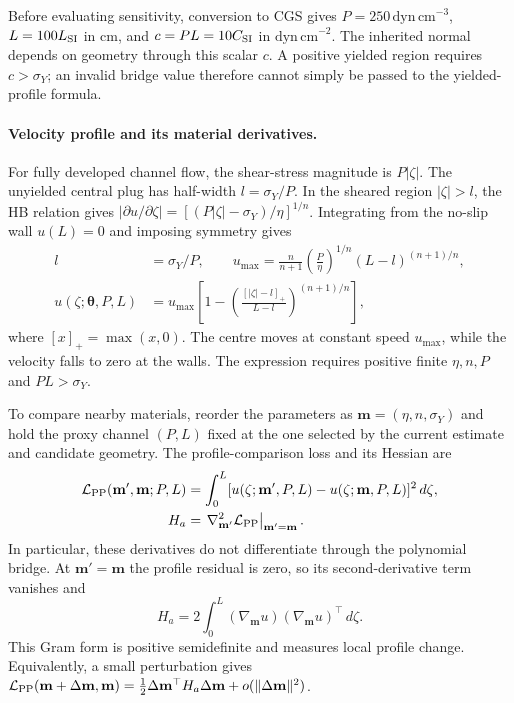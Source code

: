 Before evaluating sensitivity, conversion to CGS gives
$P=250\,\mathrm{dyn\,cm}^{-3}$, $L=100L_{\rm SI}$ in cm, and
$c=PL=10C_{\rm SI}$ in $\mathrm{dyn\,cm}^{-2}$. The inherited
normal depends on geometry through this scalar $c$. A positive yielded
region requires $c>\sigma_Y$; an invalid bridge value therefore cannot
simply be passed to the yielded-profile formula.

\paragraph{Velocity profile and its material derivatives.}
For fully developed channel flow, the shear-stress magnitude is
$P|\zeta|$. The unyielded central plug has half-width
$l=\sigma_Y/P$. In the sheared region $|\zeta|>l$, the HB relation
gives $|\partial u/\partial\zeta|=[(P|\zeta|-\sigma_Y)/\eta]^{1/n}$.
Integrating from the no-slip wall $u(L)=0$ and imposing symmetry gives
\begin{equation}
\label{eq:pp-velocity}
\begin{aligned}
 l&=\sigma_Y/P,\qquad
 u_{\max}=\frac{n}{n+1}\left(\frac P\eta\right)^{1/n}(L-l)^{(n+1)/n},\\
 u(\zeta;\boldsymbol\theta,P,L)
 &=u_{\max}\left[1-\left(\frac{[|\zeta|-l]_+}{L-l}\right)^{(n+1)/n}\right],
\end{aligned}
\end{equation}
where $[x]_+=\max(x,0)$. The centre moves at constant speed
$u_{\max}$, while the velocity falls to zero at the walls. The
expression requires positive finite $\eta,n,P$ and $PL>\sigma_Y$.

To compare nearby materials, reorder the parameters as
$\mathbf m=(\eta,n,\sigma_Y)$ and hold the proxy channel $(P,L)$
fixed at the one selected by the current estimate and candidate geometry.
The profile-comparison loss and its Hessian are
\begin{equation}
\label{eq:pp-hessian}
\begin{aligned}
 \mathcal L_{\rm PP}(\mathbf m',\mathbf m;P,L)
 &=\int_0^L [u(\zeta;\mathbf m',P,L)-u(\zeta;\mathbf m,P,L)]^2\,d\zeta,\\
 H_a&=\left.\nabla_{\mathbf m'}^2\mathcal L_{\rm PP}\right|_{\mathbf m'=\mathbf m}.
\end{aligned}
\end{equation}
In particular, these derivatives do not differentiate through the
polynomial bridge. At $\mathbf m'=\mathbf m$ the profile residual is
zero, so its second-derivative term vanishes and
\begin{equation}
\label{eq:pp-hessian-gram}
 H_a=2\int_0^L
       (\nabla_{\mathbf m}u)(\nabla_{\mathbf m}u)^\top\,d\zeta.
\end{equation}
This Gram form is positive semidefinite and measures local profile
change. Equivalently, a small perturbation gives
$\mathcal L_{\rm PP}(\mathbf m+\Delta\mathbf m,\mathbf m)
=\tfrac12\Delta\mathbf m^\top H_a\Delta\mathbf m
+o(\|\Delta\mathbf m\|^2)$.

